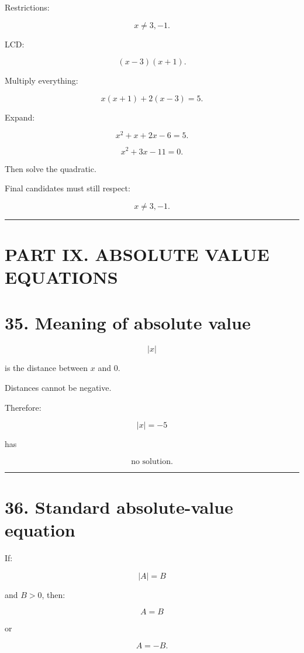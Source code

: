 \documentclass[
]{article}
\begin{document}
Restrictions:

\[
x\neq3,-1.
\]

LCD:

\[
(x-3)(x+1).
\]

Multiply everything:

\[
x(x+1)+2(x-3)=5.
\]

Expand:

\[
x^2+x+2x-6=5.
\]

\[
x^2+3x-11=0.
\]

Then solve the quadratic.

Final candidates must still respect:

\[
x\neq3,-1.
\]

\begin{center}\rule{0.5\linewidth}{0.5pt}\end{center}

\section{PART IX. ABSOLUTE VALUE
EQUATIONS}\label{part-ix.-absolute-value-equations}

\section{35. Meaning of absolute value}\label{meaning-of-absolute-value}

\[
|x|
\]

is the distance between \(x\) and \(0\).

Distances cannot be negative.

Therefore:

\[
|x|=-5
\]

has

\[
\boxed{\text{no solution}}.
\]

\begin{center}\rule{0.5\linewidth}{0.5pt}\end{center}

\section{36. Standard absolute-value
equation}\label{standard-absolute-value-equation}

If:

\[
|A|=B
\]

and \(B>0\), then:

\[
A=B
\]

or

\[
A=-B.
\]
\end{document}
